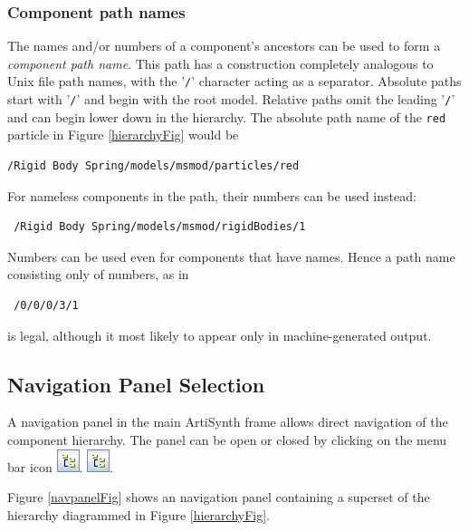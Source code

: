 \documentclass{article}
\begin{document}
\subsubsection{Component path names}
\label{pathNamesSec}

The names and/or numbers of a component's ancestors can be used to
form a {\it component path name}. This path has a construction completely
analogous to Unix file path names, with the '{\tt /}' character acting as
a separator. Absolute paths start with '{\tt /}' and begin with the root
model. Relative paths omit the leading '{\tt /}' and can begin lower down
in the hierarchy.  The absolute path name of the {\tt red} particle in
Figure \ref{hierarchyFig} would be

\begin{verbatim}
/Rigid Body Spring/models/msmod/particles/red
\end{verbatim}

For nameless components in the path, their
numbers can be used instead:

\begin{verbatim}
 /Rigid Body Spring/models/msmod/rigidBodies/1
\end{verbatim}

Numbers can be used even for components that have names.
Hence a path name consisting only of numbers, as in

\begin{verbatim}
 /0/0/0/3/1
\end{verbatim}

is legal, although it most likely to appear only in machine-generated
output.

\subsection{Navigation Panel Selection}
\label{navPanelSec}

A navigation panel in the main ArtiSynth frame allows direct
navigation of the component hierarchy. The panel can be
open or closed by clicking on the menu bar icon 
\iflatexml
\includegraphics[]{images/navpanelIcon}.
\else
\includegraphics[width=.25in]{images/navpanelIcon}.
\fi

Figure \ref{navpanelFig} shows an navigation panel containing a superset
of the hierarchy diagrammed in Figure \ref{hierarchyFig}.
\end{document}
